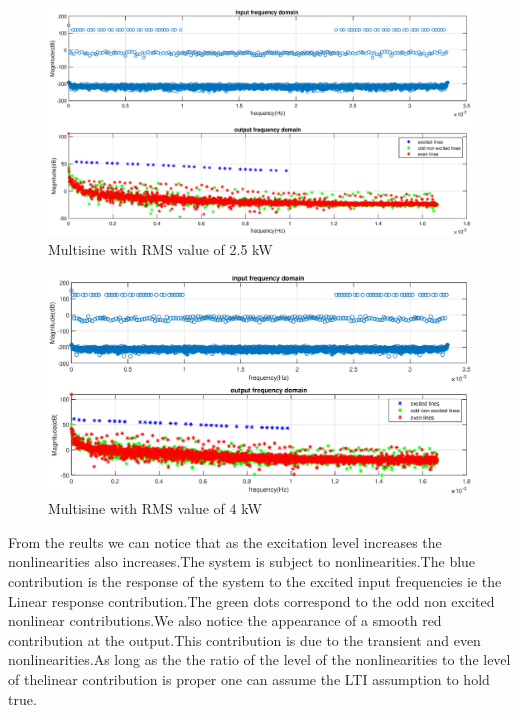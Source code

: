 \documentclass[a4paper,12pt]{article}
\numberwithin{equation}{section}
\begin{document}
\begin{figure}[H]
    \includegraphics[scale=0.5]{fdomain_input_rms_2500.eps}
    \centering
    \caption{Multisine with RMS value of 2.5 kW}
    \label{fig:MS_2.5}
\end{figure}

\begin{figure}[H]
    \includegraphics[scale=0.6]{fdomain_input_rms_4000.eps}
    \centering
    \caption{Multisine with RMS value of 4 kW}
    \label{fig:MS_4.0}
\end{figure}

From the reults we can notice that as the excitation level increases the nonlinearities also increases.The system is subject to nonlinearities.The blue contribution is the response of the system to the excited input frequencies ie the Linear response contribution.The green dots correspond to the odd non excited nonlinear contributions.We also notice the appearance of a smooth red contribution at the output.This contribution is due to the transient and even nonlinearities.As long as the the ratio of the level of the nonlinearities to the level of thelinear contribution is proper one can assume the LTI assumption to hold true.
\end{document}
